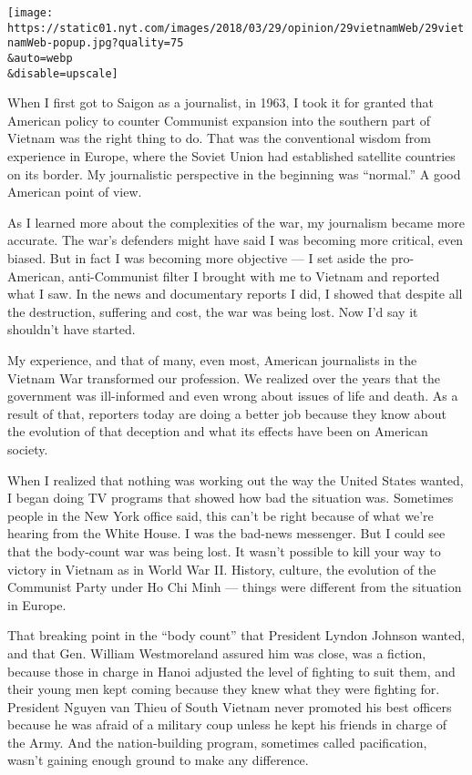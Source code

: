 \texttt{[image: https://static01.nyt.com/images/2018/03/29/opinion/29vietnamWeb/29vietnamWeb-popup.jpg?quality=75\\\&auto=webp\\\&disable=upscale]}

When I first got to Saigon as a journalist, in 1963, I took it for
granted that American policy to counter Communist expansion into the
southern part of Vietnam was the right thing to do. That was the
conventional wisdom from experience in Europe, where the Soviet Union
had established satellite countries on its border. My journalistic
perspective in the beginning was ``normal.'' A good American point of
view.

As I learned more about the complexities of the war, my journalism
became more accurate. The war's defenders might have said I was becoming
more critical, even biased. But in fact I was becoming more objective
--- I set aside the pro-American, anti-Communist filter I brought with
me to Vietnam and reported what I saw. In the news and documentary
reports I did, I showed that despite all the destruction, suffering and
cost, the war was being lost. Now I'd say it shouldn't have started.

My experience, and that of many, even most, American journalists in the
Vietnam War transformed our profession. We realized over the years that
the government was ill-informed and even wrong about issues of life and
death. As a result of that, reporters today are doing a better job
because they know about the evolution of that deception and what its
effects have been on American society.

When I realized that nothing was working out the way the United States
wanted, I began doing TV programs that showed how bad the situation was.
Sometimes people in the New York office said, this can't be right
because of what we're hearing from the White House. I was the bad-news
messenger. But I could see that the body-count war was being lost. It
wasn't possible to kill your way to victory in Vietnam as in World War
II. History, culture, the evolution of the Communist Party under Ho Chi
Minh --- things were different from the situation in Europe.

That breaking point in the ``body count'' that President Lyndon Johnson
wanted, and that Gen. William Westmoreland assured him was close, was a
fiction, because those in charge in Hanoi adjusted the level of fighting
to suit them, and their young men kept coming because they knew what
they were fighting for. President Nguyen van Thieu of South Vietnam
never promoted his best officers because he was afraid of a military
coup unless he kept his friends in charge of the Army. And the
nation-building program, sometimes called pacification, wasn't gaining
enough ground to make any difference.

